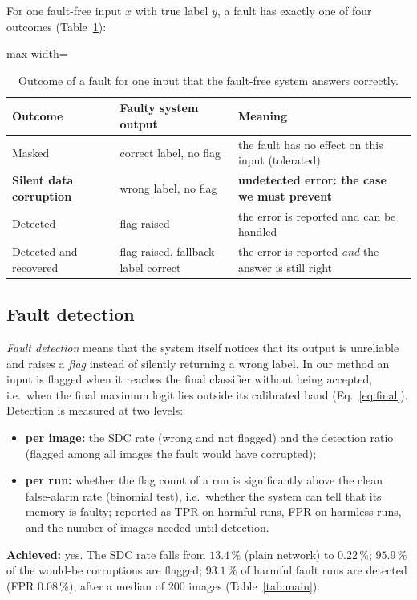 \documentclass[10pt,a4paper]{article}
\begin{document}
For one fault-free input $x$ with true label $y$, a fault has exactly one of four outcomes (Table~\ref{tab:outcomes}):

\begin{table}[H]
\centering\small
\caption{Outcome of a fault for one input that the fault-free system answers correctly.}
\label{tab:outcomes}
\begin{adjustbox}{max width=\linewidth}
\begin{tabular}{@{}lll@{}}
\toprule
Outcome & Faulty system output & Meaning \\
\midrule
Masked                          & correct label, no flag  & the fault has no effect on this input (tolerated) \\
\textbf{Silent data corruption} & wrong label, no flag    & \textbf{undetected error: the case we must prevent} \\
Detected                        & flag raised             & the error is reported and can be handled \\
Detected and recovered          & flag raised, fallback label correct & the error is reported \emph{and} the answer is still right \\
\bottomrule
\end{tabular}
\end{adjustbox}
\end{table}

\subsection{Fault detection}\label{sec:defdetect}

\emph{Fault detection} means that the system itself notices that its output is unreliable and raises a
\emph{flag} instead of silently returning a wrong label. In our method an input is flagged when it reaches the
final classifier without being accepted, i.e.\ when the final maximum logit lies outside its calibrated band
(Eq.~\eqref{eq:final}). Detection is measured at two levels:
\begin{itemize}
  \item \textbf{per image:} the SDC rate (wrong and not flagged) and the detection ratio (flagged among all
        images the fault would have corrupted);
  \item \textbf{per run:} whether the flag count of a run is significantly above the clean false-alarm rate
        (binomial test), i.e.\ whether the system can tell that its memory is faulty; reported as TPR on harmful
        runs, FPR on harmless runs, and the number of images needed until detection.
\end{itemize}
\textbf{Achieved:} yes. The SDC rate falls from $13.4\,\%$ (plain network) to $0.22\,\%$; $95.9\,\%$ of the
would-be corruptions are flagged; $93.1\,\%$ of harmful fault runs are detected (FPR $0.08\,\%$), after a median of
200 images (Table~\ref{tab:main}).
\end{document}

